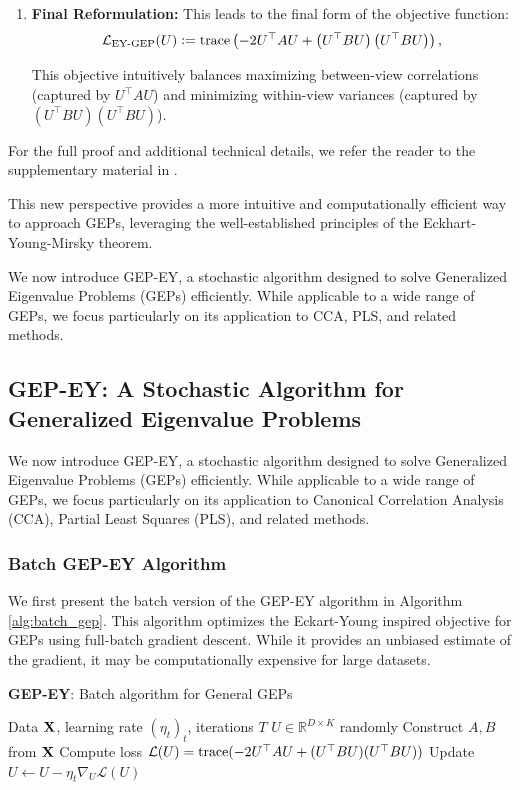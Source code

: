 \begin{enumerate}
    \item \textbf{Final Reformulation:} This leads to the final form of the objective function:
    \[
    \mathcal{L}_\text{EY-GEP}(U) \vcentcolon= \operatorname{trace} \left( - 2U^\top A U + \left(U^\top B U\right) \left(U^\top B U\right) \right),
    \]

    This objective intuitively balances maximizing between-view correlations (captured by \(U^\top A U\)) and minimizing within-view variances (captured by \((U^\top B U)(U^\top B U)\)).
\end{enumerate}


For the full proof and additional technical details, we refer the reader to the supplementary material in \citet{chapman2023efficient}.

This new perspective provides a more intuitive and computationally efficient way to approach GEPs, leveraging the well-established principles of the Eckhart-Young-Mirsky theorem.

We now introduce GEP-EY, a stochastic algorithm designed to solve Generalized Eigenvalue Problems (GEPs) efficiently. While applicable to a wide range of GEPs, we focus particularly on its application to CCA, PLS, and related methods.

\subsection{GEP-EY: A Stochastic Algorithm for Generalized Eigenvalue Problems}

We now introduce GEP-EY, a stochastic algorithm designed to solve Generalized Eigenvalue Problems (GEPs) efficiently. While applicable to a wide range of GEPs, we focus particularly on its application to Canonical Correlation Analysis (CCA), Partial Least Squares (PLS), and related methods.

\subsubsection{Batch GEP-EY Algorithm}

We first present the batch version of the GEP-EY algorithm in Algorithm \ref{alg:batch_gep}. This algorithm optimizes the Eckart-Young inspired objective for GEPs using full-batch gradient descent. While it provides an unbiased estimate of the gradient, it may be computationally expensive for large datasets.

\begin{algorithm}
\caption{\textbf{GEP-EY}: Batch algorithm for General GEPs}
\label{alg:batch-gep}
\begin{algorithmic}
 Data $\mathbf{X}$, learning rate $(\eta_t)_t$, iterations $T$
 $U \in \mathbb{R}^{D \times K}$ randomly
\STATE Construct $A, B$ from $\mathbf{X}$
\STATE Compute loss $\mathcal{L}(U) = \operatorname{trace}(-2U^\top A U + (U^\top B U)(U^\top B U))$
\STATE Update $U \leftarrow U - \eta_t \nabla_U \mathcal{L}(U)$
\ENDFOR
\end{algorithmic}
\end{algorithm}


